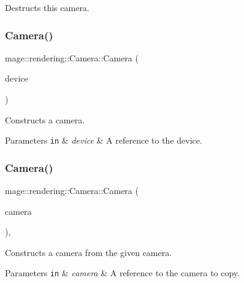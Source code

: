 Destructs this camera. \hypertarget{classmage_1_1rendering_1_1_camera_a872aafc40d35c1481a4147c73fdbc00a}{}\label{classmage_1_1rendering_1_1_camera_a872aafc40d35c1481a4147c73fdbc00a} 
\subsubsection{\texorpdfstring{Camera()}{Camera()}\hspace{0.1cm}{\footnotesize\ttfamily [1/3]}}
{\footnotesize\ttfamily mage\+::rendering\+::\+Camera\+::\+Camera (\begin{DoxyParamCaption}\item[{I\+D3\+D11\+Device \&}]{device }\end{DoxyParamCaption})\hspace{0.3cm}{\ttfamily [protected]}}

Constructs a camera.


\begin{DoxyParams}[1]{Parameters}
\mbox{\tt in}  & {\em device} & A reference to the device. \\
\hline
\end{DoxyParams}
\hypertarget{classmage_1_1rendering_1_1_camera_ac4e1e9f230416c0aaea12d2b0fff02c1}{}\label{classmage_1_1rendering_1_1_camera_ac4e1e9f230416c0aaea12d2b0fff02c1} 
\subsubsection{\texorpdfstring{Camera()}{Camera()}\hspace{0.1cm}{\footnotesize\ttfamily [2/3]}}
{\footnotesize\ttfamily mage\+::rendering\+::\+Camera\+::\+Camera (\begin{DoxyParamCaption}\item[{const \hyperlink{classmage_1_1rendering_1_1_camera}{Camera} \&}]{camera }\end{DoxyParamCaption})\hspace{0.3cm}{\ttfamily [protected]}, {\ttfamily [delete]}}

Constructs a camera from the given camera.


\begin{DoxyParams}[1]{Parameters}
\mbox{\tt in}  & {\em camera} & A reference to the camera to copy. \\
\hline
\end{DoxyParams}
\hypertarget{classmage_1_1rendering_1_1_camera_a7ac683929b75589e3f396a76a6afb9cf}{}\label{classmage_1_1rendering_1_1_camera_a7ac683929b75589e3f396a76a6afb9cf} 
